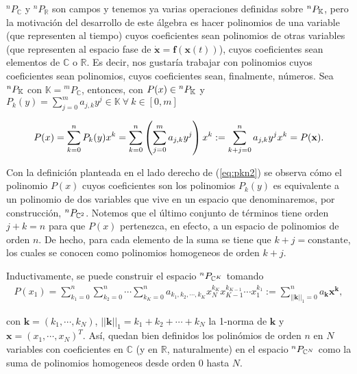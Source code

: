 $^nP_{\mathbb{C}}$ y $^nP_{\mathbb{R}}$ son campos y tenemos ya varias operaciones definidas sobre ${^{n}P_{\mathbb{K}}}$, pero la motivación del desarrollo de este álgebra es hacer polinomios de una variable (que representen al tiempo) cuyos coeficientes sean polinomios de otras variables (que representen al espacio fase de $\dot{\mathbf{x}} = \mathbf{f}(\mathbf{x}(t))$), cuyos coeficientes sean elementos de $\mathbb{C}$ o $\mathbb{R}$. Es decir, nos gustaría trabajar con polinomios cuyos coeficientes sean polinomios, cuyos coeficientes sean, finalmente, números.
Sea  ${^{n}P_{\mathbb{K}}}$ con $\mathbb{K} = {{^{m}P_{\mathbb{C}}}}$, entonces, con $P(x) \in {^{n}P_{\mathbb{K}}}$ y $P_k(y) = \sum_{j=0}^m a_{j,k}y^j \in \mathbb{K} \ \forall \  k \in [0,m]$

\begin{equation}
 P(x) =  \sum_{k=0}^n P_k(y) x^k = \sum_{k=0}^n \left( \sum_{j=0}^m a_{j,k} y^j \right) x^k := \sum_{k+j=0}^n a_{j,k} y^j x^k = P(\mathbf{x}).
\label{eq:pkn2}
\end{equation}

Con la definición planteada en el lado derecho de (\ref{eq:pkn2}) se observa cómo el polinomio $P(x)$ cuyos coeficientes son los polinomios $P_k(y)$ es equivalente a un polinomio de dos variables que vive en un espacio que denominaremos, por construcción, ${^{n}P_{\mathbb{C}^ 2} }$. Notemos que el último conjunto de términos tiene orden $j+k = n$ para que $P(x)$  pertenezca, en efecto, a un espacio de polinomios de orden $n$. De hecho, para cada elemento de la suma se tiene que $k+j= \text{constante}$, los cuales se conocen como polinomios homogeneos de orden $k+j$.

Inductivamente, se puede construir el espacio ${^{n}P_{\mathbb{C}^ K} }$ tomando
\begin{align}
 P(x_1) = \sum_{k_{1}=0}^n\sum_{k_2=0}^n\cdots\sum_{k_K=0}^n a_{k_{1},k_{2},\cdots,k_{K}}x_N^{k_{K}}x_{K-1}^{k_{K-1}} \cdots x_1^{k_{1}} := \sum_{||\mathbf{k}||_{1}=0}^n a_{\mathbf{k}}\mathbf{x}^{\mathbf{k}},
\label{eq:pknN}
\end{align}

con $\mathbf{k} = (k_1,\cdots,k_N)$, $||\mathbf{k}||_1 = k_1+k_2+\cdots+k_N$ la 1-norma de $\mathbf{k}$ y $\mathbf{x} = (x_1,\cdots,x_N)^T$. Así, quedan bien definidos los polinómios de orden $n$ en $N$ variables con coeficientes en $\mathbb{C}$ (y en $\mathbb{R}$, naturalmente) en el espacio ${^{n}P_{\mathbb{C}^ N} }$ como la suma de polinomios homogeneos desde orden $0$ hasta $N$.


